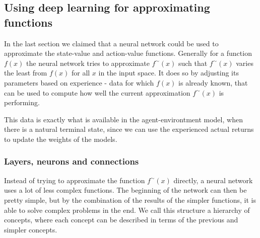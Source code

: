 \documentclass[11pt]{article}
\begin{document}
\maketitle

\subsection{Using deep learning for approximating functions}

In the last section we claimed that a neural network could be used to approximate the
state-value and action-value functions.
Generally for a function $f(x)$ the neural network tries to approximate $f^\sim(x)$
such that $f^\sim(x)$ varies the least from $f(x)$ for all $x$ in the input space\cite{DeepLearningBook}.
It does so by adjusting its parameters based on experience - data for which $f(x)$ is already known,
that can be used to compute how well the current approximation $f^\sim(x)$ is performing.

This data is exactly what is available in the agent-environtment model, when there is a natural terminal state,
since we can use the experienced actual returns to update the weights of the models.

\subsubsection{Layers, neurons and connections}

Instead of trying to approximate the function $f^\sim(x)$ directly,
a neural network uses a lot of less complex functions.
The beginning of the network can then be pretty simple, but by the combination of the results of
the simpler functions, it is able to solve complex problems in the end.
We call this structure a hierarchy of concepts, where each concept can be described in terms
of the previous and simpler concepts\cite{DeepLearningBook}.
\end{document}
